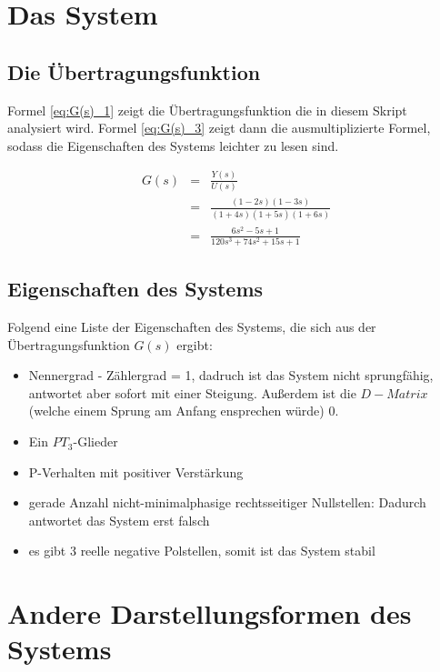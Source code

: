 \section{Das System}

\subsection{Die Übertragungsfunktion}

Formel \ref{eq:G(s)_1} zeigt die Übertragungsfunktion die in diesem Skript analysiert wird. Formel \ref{eq:G(s)_3} zeigt dann die ausmultiplizierte Formel, sodass die Eigenschaften des Systems leichter zu lesen sind.

\begin{eqnarray}
    \label{eq:G(s)_1}
    G(s) &=& \frac{Y(s)}{U(s)} \\
    \label{eq:G(s)_2}
    &=& \frac{(1-2s)(1-3s)}{(1+4s)(1+5s)(1+6s)} \\
    \label{eq:G(s)_3}
    &=& \frac{6s^2 - 5s + 1}{120s^3 + 74s^2 + 15s +1}
\end{eqnarray}

\subsection{Eigenschaften des Systems}

Folgend eine Liste der Eigenschaften des Systems, die sich aus der Übertragungsfunktion $G(s)$ ergibt:

\begin{itemize}
    \item Nennergrad - Zählergrad = 1, dadruch ist das System nicht sprungfähig, antwortet aber sofort mit einer Steigung. Außerdem ist die $D-Matrix$ (welche einem Sprung am Anfang ensprechen würde) $0$.
    \item Ein $PT_3$-Glieder
    \item P-Verhalten mit positiver Verstärkung
    \item gerade Anzahl nicht-minimalphasige rechtsseitiger Nullstellen: Dadurch antwortet das System erst falsch
    \item es gibt 3 reelle negative Polstellen, somit ist das System stabil
\end{itemize}

\section{Andere Darstellungsformen des Systems}

